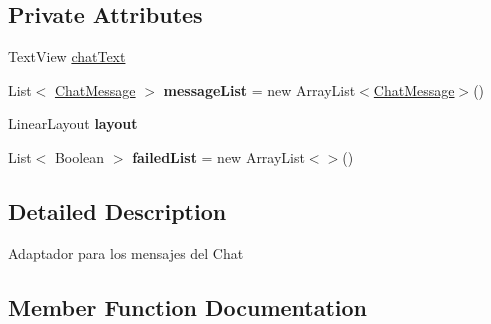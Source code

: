 \subsection*{Private Attributes}
\begin{DoxyCompactItemize}
\item 
Text\+View \hyperlink{classcom_1_1example_1_1sebastian_1_1tindertp_1_1chatTools_1_1ChatArrayAdapter_abebb98649311b1a98f60a8238e346b99}{chat\+Text}
\item 
List$<$ \hyperlink{classcom_1_1example_1_1sebastian_1_1tindertp_1_1chatTools_1_1ChatMessage}{Chat\+Message} $>$ {\bfseries message\+List} = new Array\+List$<$\hyperlink{classcom_1_1example_1_1sebastian_1_1tindertp_1_1chatTools_1_1ChatMessage}{Chat\+Message}$>$()\hypertarget{classcom_1_1example_1_1sebastian_1_1tindertp_1_1chatTools_1_1ChatArrayAdapter_ac32d9c03716a723d42d6f7d61a40171b}{}\label{classcom_1_1example_1_1sebastian_1_1tindertp_1_1chatTools_1_1ChatArrayAdapter_ac32d9c03716a723d42d6f7d61a40171b}

\item 
Linear\+Layout {\bfseries layout}\hypertarget{classcom_1_1example_1_1sebastian_1_1tindertp_1_1chatTools_1_1ChatArrayAdapter_af8d0dcdc96da0bade29586b7f3fd6625}{}\label{classcom_1_1example_1_1sebastian_1_1tindertp_1_1chatTools_1_1ChatArrayAdapter_af8d0dcdc96da0bade29586b7f3fd6625}

\item 
List$<$ Boolean $>$ {\bfseries failed\+List} = new Array\+List$<$$>$()\hypertarget{classcom_1_1example_1_1sebastian_1_1tindertp_1_1chatTools_1_1ChatArrayAdapter_a4590c2c2454eac0519f7e35911668b5b}{}\label{classcom_1_1example_1_1sebastian_1_1tindertp_1_1chatTools_1_1ChatArrayAdapter_a4590c2c2454eac0519f7e35911668b5b}

\end{DoxyCompactItemize}


\subsection{Detailed Description}
Adaptador para los mensajes del Chat 

\subsection{Member Function Documentation}
